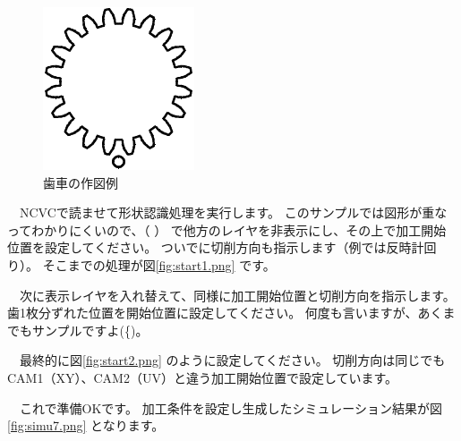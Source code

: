 \begin{figure}[H]
\centering
\includegraphics{No2/fig/sample8-crop.pdf}
\caption{歯車の作図例}
\label{fig:sample8.pdf}
\end{figure}

　NCVCで読ませて形状認識処理を実行します。
このサンプルでは図形が重なってわかりにくいので、（\,\,） で他方のレイヤを非表示にし、その上で加工開始位置を設定してください。
ついでに切削方向も指示します（例では反時計回り）。
そこまでの処理が図\ref{fig:start1.png} です。


　次に表示レイヤを入れ替えて、同様に加工開始位置と切削方向を指示します。
歯1枚分ずれた位置を開始位置に設定してください。
何度も言いますが、あくまでもサンプルですよ(^^;)。

　最終的に図\ref{fig:start2.png} のように設定してください。
切削方向は同じでもCAM1（XY）、CAM2（UV）と違う加工開始位置で設定しています。


　これで準備OKです。
加工条件を設定し生成したシミュレーション結果が図\ref{fig:simu7.png} となります。


